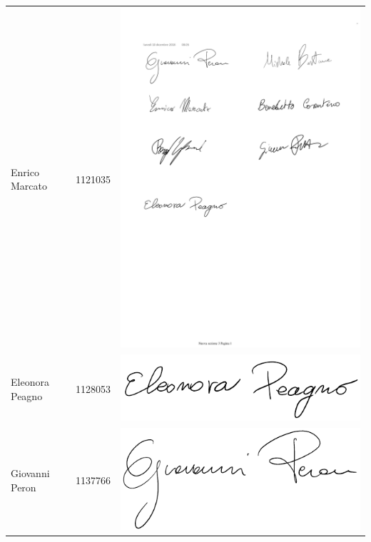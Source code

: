 {\begin{table}[H]
\begin{tabular}{| l | c | >{\centering\arraybackslash}m{8cm}
		|}
	Enrico Marcato & 1121035 & \includegraphics[scale=0.65]{images/firme/enrico.pdf}\\
	Eleonora Peagno & 1128053 & \includegraphics[scale=0.6]{images/firme/ele.pdf}\\
	Giovanni Peron & 1137766 & \includegraphics[scale=0.5]{images/firme/perry.pdf}\\

\end{tabular}
\end{table}}
